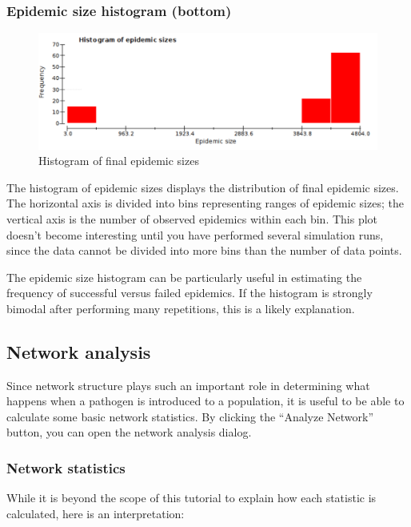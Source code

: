 \documentclass{article}
\begin{document}
\subsubsection{Epidemic size histogram (bottom)}
\begin{figure}[h]
\begin{center}
\includegraphics[width = 6in]{hist_example.pdf}
\caption{Histogram of final epidemic sizes}
\end{center}
\end{figure}
The histogram of epidemic sizes displays the distribution of final epidemic sizes.  The horizontal axis is divided into bins representing ranges of epidemic sizes; the vertical axis is the number of observed epidemics within each bin.  This plot doesn't become interesting until you have performed several simulation runs, since the data cannot be divided into more bins than the number of data points.

The epidemic size histogram can be particularly useful in estimating the frequency of successful versus failed epidemics.  If the histogram is strongly bimodal after performing many repetitions, this is a likely explanation.

\subsection{Network analysis}
Since network structure plays such an important role in determining what happens when a pathogen is introduced to a population, it is useful to be able to calculate some basic network statistics.  By clicking the ``Analyze Network'' button, you can open the network analysis dialog.

\subsubsection{Network statistics}
While it is beyond the scope of this tutorial to explain how each statistic is calculated, here is an interpretation:
\end{document}
